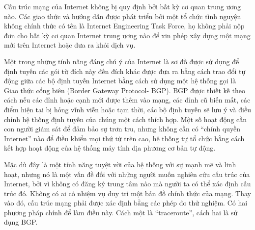Cấu trúc mạng của Internet không bị quy định bởi bất kỳ cơ quan trung ương nào. Các giao thức và hướng dẫn được phát triển bởi một tổ chức tình nguyện không chính thức có tên là Internet Engineering Task Force, họ không phải nộp đơn cho bất kỳ cơ quan Internet trung ương nào để xin phép xây dựng một mạng mới trên Internet hoặc đưa ra khỏi dịch vụ.\par
Một trong những tính năng đáng chú ý của Internet là sơ đồ được sử dụng để định tuyến các gói từ đích này đến đích khác được đưa ra bằng cách trao đổi tự động giữa các bộ định tuyến Internet bằng cách sử dụng một hệ thống gọi là Giao thức cổng biên (Border Gateway Protocol- BGP). BGP được thiết kế theo cách nếu các đỉnh hoặc cạnh mới được thêm vào mạng, các đỉnh cũ biến mất, các điểm hiện tại bị hỏng vĩnh viễn hoặc tạm thời, các bộ định tuyến sẽ lưu ý và điều chỉnh hệ thống định tuyến của chúng một cách thích hợp. Một số hoạt động cần con người giám sát để đảm bảo sự trơn tru, nhưng không cần có “chính quyền Internet” nào để điều khiển mọi thứ từ trên cao, hệ thống tự tổ chức bằng cách kết hợp hoạt động của hệ thống máy tính địa phương cơ bản tự động.\par
Mặc dù đây là một tính năng tuyệt vời của hệ thống với sự mạnh mẽ và linh hoạt, nhưng nó là một vấn đề đối với những người muốn nghiên cứu cấu trúc của Internet, bởi vì không có đăng ký trung tâm nào mà người ta có thể xác định cấu trúc đó. Không có ai có nhiệm vụ duy trì một bản đồ chính thức của mạng. Thay vào đó, cấu trúc mạng phải được xác định bằng các phép đo thử nghiệm. Có hai phương pháp chính để làm điều này. Cách một là “traceroute”, cách hai là sử dụng BGP.\par
